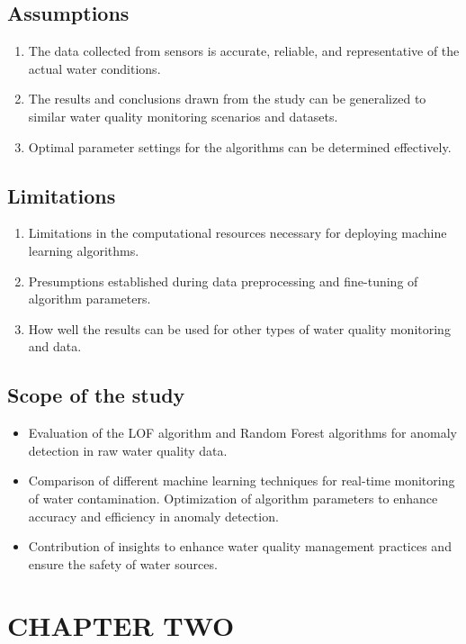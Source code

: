 \documentclass[12pt]{report}
\begin{document}
\subsection{Assumptions}
\begin{enumerate}
    \item The data collected from sensors is accurate, reliable, and representative of the actual water conditions.
\item  The  results and conclusions drawn from the study can be generalized to similar water quality monitoring scenarios and datasets.
\item Optimal parameter settings for the algorithms can be determined effectively.
\end{enumerate}
\subsection{Limitations}
\begin{enumerate}
    \item Limitations in the computational resources necessary for deploying machine learning algorithms.
\item Presumptions established during data preprocessing and fine-tuning of algorithm parameters.
\item  How well the results can be used for other types of water quality monitoring and data.
\end{enumerate}

\subsection{Scope of the  study}
\begin{itemize}
    \item Evaluation of the LOF algorithm and Random Forest algorithms for anomaly detection in raw water quality data.
\item Comparison of different machine learning techniques for real-time monitoring of water contamination.
Optimization of algorithm parameters to enhance accuracy and efficiency in anomaly detection.
\item Contribution of insights to enhance water quality management practices and ensure the safety of water sources.
\end{itemize}

\clearpage

\section{\centering CHAPTER TWO}
\end{document}
